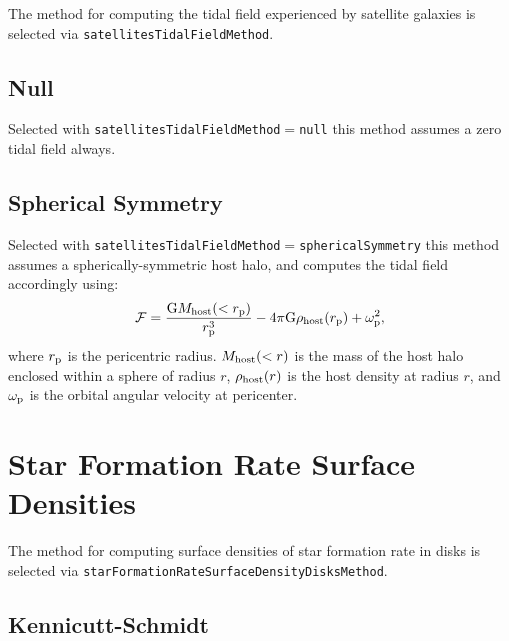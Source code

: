 The method for computing the tidal field experienced by satellite galaxies is selected via {\tt satellitesTidalFieldMethod}.

\subsection{Null}

Selected with {\tt satellitesTidalFieldMethod}$=${\tt null} this method assumes a zero tidal field always.

\subsection{Spherical Symmetry}

Selected with {\tt satellitesTidalFieldMethod}$=${\tt sphericalSymmetry} this method assumes a spherically-symmetric host halo, and computes the tidal field accordingly using:
\begin{equation}
 \mathcal{F} = {{\rm G} M_{\rm host}(<r_{\rm p}) \over r_{\rm p}^3} - 4 \pi {\rm G} \rho_{\rm host}(r_{\rm p}) + \omega_{\rm p}^2,
\end{equation}
where $r_{\rm p}$ is the pericentric radius. $M_{\rm host}(<r)$ is the mass of the host halo enclosed within a sphere of radius $r$, $\rho_{\rm host}(r)$ is the host density at radius $r$, and $\omega_{\rm p}$ is the orbital angular velocity at pericenter.

\section{Star Formation Rate Surface Densities}\label{sec:StarFormationRateSurfaceDensity}

The method for computing surface densities of star formation rate in disks is selected via {\tt starFormationRateSurfaceDensityDisksMethod}.

\subsection{Kennicutt-Schmidt}\label{sec:StarFormationKennicuttSchmidt}

